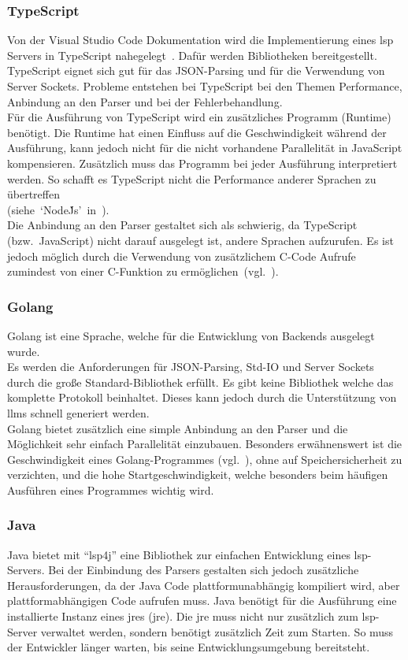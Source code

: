 \documentclass[./einleitung.tex]{subfiles}
\begin{document}
\subsubsection{TypeScript}
Von der Visual Studio Code Dokumentation wird die Implementierung eines \acrshort{lsp} Servers in TypeScript nahegelegt~\cite{vscodeDoc}.
Dafür werden Bibliotheken bereitgestellt.
TypeScript eignet sich gut für das JSON-Parsing und für die Verwendung von Server Sockets.
Probleme entstehen bei TypeScript bei den Themen Performance, Anbindung an den Parser und bei der Fehlerbehandlung.\\
Für die Ausführung von TypeScript wird ein zusätzliches Programm (Runtime) benötigt.
Die Runtime hat einen Einfluss auf die Geschwindigkeit während der Ausführung, kann jedoch nicht für die nicht vorhandene Parallelität in JavaScript kompensieren.
Zusätzlich muss das Programm bei jeder Ausführung interpretiert werden.
So schafft es TypeScript nicht die Performance anderer Sprachen zu übertreffen\\
(siehe~`Node\.Js'~in~\cite{performanceLanguages}).\\
Die Anbindung an den Parser gestaltet sich als schwierig, da TypeScript (bzw.~JavaScript) nicht darauf ausgelegt ist, andere Sprachen aufzurufen.
Es ist jedoch möglich durch die Verwendung von zusätzlichem C-Code Aufrufe zumindest von einer C-Funktion zu ermöglichen~(vgl.~\cite{callCFromJS}).


\subsubsection{Golang}
Golang ist eine Sprache, welche für die Entwicklung von Backends ausgelegt wurde. \\
Es werden die Anforderungen für JSON-Parsing, Std-IO und Server Sockets durch die große Standard-Bibliothek erfüllt.
Es gibt keine Bibliothek welche das komplette Protokoll beinhaltet.
Dieses kann jedoch durch die Unterstützung von \acrshort{llm}s schnell generiert werden.\\
Golang bietet zusätzlich eine simple Anbindung an den Parser und die Möglichkeit sehr einfach Parallelität einzubauen.
Besonders erwähnenswert ist die Geschwindigkeit eines Golang-Programmes (vgl.~\cite{performanceLanguages}), ohne auf Speichersicherheit zu verzichten, und die hohe Startgeschwindigkeit, welche besonders beim häufigen Ausführen eines Programmes wichtig wird.

\subsubsection{Java}
Java bietet mit ``lsp4j'' eine Bibliothek zur einfachen Entwicklung eines \acrshort{lsp}-Servers.
Bei der Einbindung des Parsers gestalten sich jedoch zusätzliche Herausforderungen, da der Java Code plattformunabhängig kompiliert wird, aber plattformabhängigen Code aufrufen muss.
Java benötigt für die Ausführung eine installierte Instanz eines \acrlong{jre}s (\acrshort{jre}).
Die \acrshort{jre} muss nicht nur zusätzlich zum \acrshort{lsp}-Server verwaltet werden, sondern benötigt zusätzlich Zeit zum Starten.
So muss der Entwickler länger warten, bis seine Entwicklungsumgebung bereitsteht.
\end{document}
